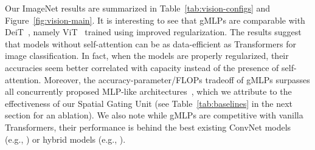\documentclass{article}
\newcommand{\gffn}{gMLP\xspace}
\begin{document}
Our ImageNet results are summarized in Table~\ref{tab:vision-configs} and Figure~\ref{fig:vision-main}.
It is interesting to see that
\gffn{s} are comparable with DeiT~\cite{touvron2020training},
namely ViT~\cite{dosovitskiy2020image} trained using improved regularization.
The results suggest that models without self-attention can be as data-efficient as Transformers for image classification.
In fact,
when the models are properly regularized, their accuracies seem better correlated with capacity instead of the presence of self-attention.
Moreover,
the accuracy-parameter/FLOPs tradeoff of
\gffn{s} surpasses all concurrently proposed MLP-like architectures~\cite{tolstikhin2021mlpmixer, melaskyriazi2021doyou, touvron2021resmlp},
which we attribute to the effectiveness of our Spatial Gating Unit (see Table~\ref{tab:baselines} in the next section for an ablation). We also note while \gffn{s} are competitive with vanilla Transformers, their performance is behind the best existing ConvNet models (e.g., \cite{brock2021high, tan2021efficientnetv2}) or hybrid models (e.g., \cite{bello2021lambdanetworks, vaswani2021scaling, srinivas2021bottleneck, wu2021cvt, liu2021swin}).
\end{document}
